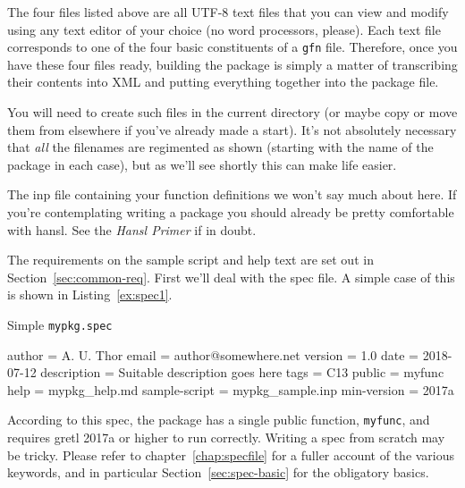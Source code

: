 \documentclass[oneside]{book}
\begin{document}
The four files listed above are all UTF-8 text files that you can view
and modify using any text editor of your choice (no word processors,
please). Each text file corresponds to one of the four basic
constituents of a \texttt{gfn} file. Therefore, once you have these
four files ready, building the package is simply a matter of
transcribing their contents into XML and putting everything together
into the package file.

You will need to create such files in the current directory (or maybe
copy or move them from elsewhere if you've already made a start). It's
not absolutely necessary that \textit{all} the filenames are
regimented as shown (starting with the name of the package in each
case), but as we'll see shortly this can make life easier.

The \textsf{inp} file containing your function definitions we won't
say much about here. If you're contemplating writing a package you
should already be pretty comfortable with hansl. See the \textit{Hansl
  Primer} \citep{hansl-primer} if in doubt.

The requirements on the sample script and help text are set out in
Section~\ref{sec:common-req}.  First we'll deal with the \textsf{spec}
file. A simple case of this is shown in Listing~\ref{ex:spec1}.

\begin{script}[htbp]
  \caption{Simple \texttt{mypkg.spec}}
  \label{ex:spec1}
\begin{code}
author = A. U. Thor
email = author@somewhere.net
version = 1.0
date = 2018-07-12
description = Suitable description goes here
tags = C13
public = myfunc
help = mypkg_help.md
sample-script = mypkg_sample.inp
min-version = 2017a
\end{code}
\end{script}

According to this spec, the package has a single public function,
\texttt{myfunc}, and requires gretl 2017a or higher to run
correctly. Writing a \textsf{spec} from scratch may be tricky. Please
refer to chapter~\ref{chap:specfile} for a fuller account of the
various keywords, and in particular Section~\ref{sec:spec-basic} for
the obligatory basics.
\end{document}
